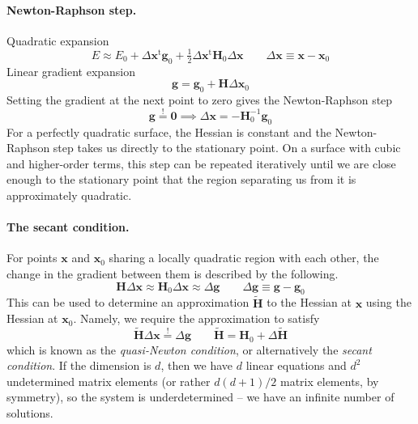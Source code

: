 \documentclass[11pt]{article}
\begin{document}
\paragraph{Newton-Raphson step.}
Quadratic expansion
\[
    E
    \approx
    E_0
    +
    \Delta\mathbf{x}^\mathrm{t}
    \mathbf{g}_0
    +
    \tfrac{1}{2}
    \Delta\mathbf{x}^\mathrm{t}
    \mathbf{H}_0
    \Delta\mathbf{x}
    \qquad
    \Delta\mathbf{x}
    \equiv
    \mathbf{x}
    -
    \mathbf{x}_0
\]
Linear gradient expansion
\[
    \mathbf{g}
    =
    \mathbf{g}_0
    +
    \mathbf{H}
    \Delta\mathbf{x}_0
\]
Setting the gradient at the next point to zero gives the Newton-Raphson step
\[
    \mathbf{g}
    \overset{!}{=}
    \mathbf{0}
    \implies
    \Delta\mathbf{x}
    =
    -
    \mathbf{H}_0^{-1}
    \mathbf{g}_0
\]
For a perfectly quadratic surface, the Hessian is constant and the
Newton-Raphson step takes us directly to the stationary point.
On a surface with cubic and higher-order terms, this step can be repeated
iteratively until we are close enough to the stationary point that the region
separating us from it is approximately quadratic.


\paragraph{The secant condition.}
For points
\(
    \mathbf{x}
\)
and
\(
    \mathbf{x}_0
\)
sharing a locally quadratic region with each other, the change in the gradient
between them is described by the following.
\[
    \mathbf{H}
    \Delta\mathbf{x}
    \approx
    \mathbf{H}_0
    \Delta\mathbf{x}
    \approx
    \Delta\mathbf{g}
    \qquad
    \Delta\mathbf{g}
    \equiv
    \mathbf{g} - \mathbf{g}_0
\]
This can be used to determine an approximation
\(
    \tilde{\mathbf{H}}
\)
to the Hessian at
\(
    \mathbf{x}
\)
using the Hessian at
\(
    \mathbf{x}_0
\).
Namely, we require the approximation to satisfy
\[
    \tilde{\mathbf{H}}
    \Delta\mathbf{x}
    \overset{!}{=}
    \Delta\mathbf{g}
    \qquad
    \tilde{\mathbf{H}}
    =
    \mathbf{H}_0
    +
    \Delta\tilde{\mathbf{H}}
\]
which is known as the {\itshape quasi-Newton condition}, or alternatively the
{\itshape secant condition}.
If the dimension is \(d\), then we have \(d\) linear equations and \(d^2\)
undetermined matrix elements (or rather \(d(d+1)/2\) matrix elements, by
symmetry), so the system is underdetermined -- we have an infinite number of
solutions.
\end{document}
